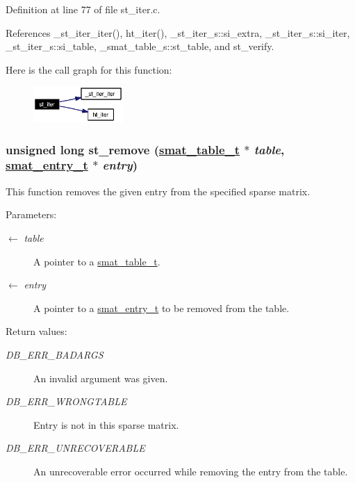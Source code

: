Definition at line 77 of file st\_\-iter.c.

References \_\-st\_\-iter\_\-iter(), ht\_\-iter(), \_\-st\_\-iter\_\-s::si\_\-extra, \_\-st\_\-iter\_\-s::si\_\-iter, \_\-st\_\-iter\_\-s::si\_\-table, \_\-smat\_\-table\_\-s::st\_\-table, and st\_\-verify.

Here is the call graph for this function:\begin{figure}[H]
\begin{center}
\leavevmode
\includegraphics[width=97pt]{group__dbprim__smat_ga14_cgraph}
\end{center}
\end{figure}
\hypertarget{group__dbprim__smat_ga12}{
\subsubsection[st\_\-remove]{\setlength{\rightskip}{0pt plus 5cm}unsigned long st\_\-remove (\hyperlink{struct__smat__table__s}{smat\_\-table\_\-t} $\ast$ {\em table}, \hyperlink{struct__smat__entry__s}{smat\_\-entry\_\-t} $\ast$ {\em entry})}}
\label{group__dbprim__smat_ga12}


This function removes the given entry from the specified sparse matrix.

\begin{Desc}
\item[Parameters:]
\begin{description}
\item[\mbox{$\leftarrow$} {\em table}]A pointer to a \hyperlink{group__dbprim__smat_ga0}{smat\_\-table\_\-t}. \item[\mbox{$\leftarrow$} {\em entry}]A pointer to a \hyperlink{group__dbprim__smat_ga2}{smat\_\-entry\_\-t} to be removed from the table.\end{description}
\end{Desc}
\begin{Desc}
\item[Return values:]
\begin{description}
\item[{\em DB\_\-ERR\_\-BADARGS}]An invalid argument was given. \item[{\em DB\_\-ERR\_\-WRONGTABLE}]Entry is not in this sparse matrix. \item[{\em DB\_\-ERR\_\-UNRECOVERABLE}]An unrecoverable error occurred while removing the entry from the table.\end{description}
\end{Desc}


